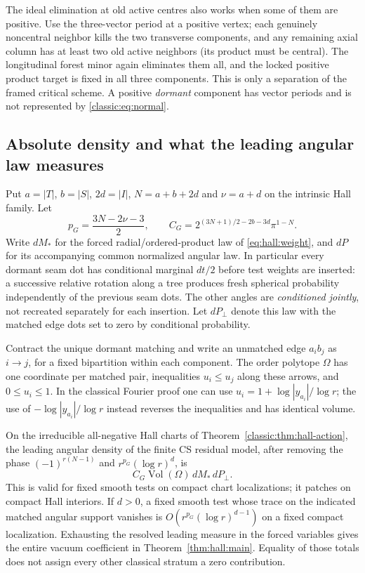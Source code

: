 The ideal elimination at old active centres also works
when some of them are positive. Use the three-vector
period at a positive vertex; each genuinely noncentral
neighbor kills the two transverse components, and any
remaining axial column has at least two old active
neighbors (its product must be central). The longitudinal
forest minor again eliminates them all, and the locked
positive product target is fixed in all three components.
This is only a separation of the framed critical scheme.
A positive \emph{dormant} component has vector periods and
is not represented by \eqref{classic:eq:normal}.

\subsection{Absolute density and what the leading angular law measures}
\label{classic:sec:leading}
Put \(a=|T|\), \(b=|S|\), \(2d=|I|\), \(N=a+b+2d\)
and \(\nu=a+d\) on the intrinsic Hall family. Let
\[
 p_G=\frac{3N-2\nu-3}{2},\qquad
 C_G=2^{(3N+1)/2-2b-3d}\pi^{1-N}.
\]
Write \(dM_*\) for the forced radial/ordered-product law of
\eqref{eq:hall:weight}, and \(dP\) for its accompanying common
normalized angular law. In particular every dormant seam dot
has conditional marginal \(dt/2\) before test weights are inserted:
a successive relative rotation along a tree produces fresh spherical
probability independently of the previous seam dots. The other
angles are \emph{conditioned jointly}, not recreated separately
for each insertion. Let \(dP_\perp\) denote this law with the
matched edge dots set to zero by conditional probability.

Contract the unique dormant matching and write an unmatched
edge \(a_i b_j\) as \(i\to j\), for a fixed bipartition within
each component. The order polytope \(\Omega\) has one
coordinate per matched pair, inequalities \(u_i\le u_j\)
along these arrows, and \(0\le u_i\le1\).
In the classical Fourier proof one can use
\(u_i=1+\log|y_{a_i}|/\log r\); the use of
\(-\log|y_{a_i}|/\log r\) instead reverses the inequalities
and has identical volume.

\begin{theorem}
\label{classic:thm:hall-stationary}
On the irreducible all-negative Hall charts of
Theorem~\ref{classic:thm:hall-action}, the leading angular
density of the finite CS residual model, after removing the
phase \((-1)^{r(N-1)}\) and \(r^{p_G}(\log r)^d\), is
\begin{equation}
 C_G\operatorname{Vol}(\Omega)\,dM_*\,dP_\perp .
 \label{classic:eq:hallleading}
\end{equation}
This is valid for fixed smooth tests on compact chart
localizations; it patches on compact Hall interiors. If
\(d>0\), a fixed smooth test whose trace on the indicated
matched angular support vanishes is \(O(r^{p_G}(\log r)^{d-1})\)
on a fixed compact localization. Exhausting the resolved
leading measure in the forced variables gives the entire
vacuum coefficient in Theorem~\ref{thm:hall:main}.
Equality of those totals does not assign every other classical
stratum a zero contribution.
\end{theorem}

